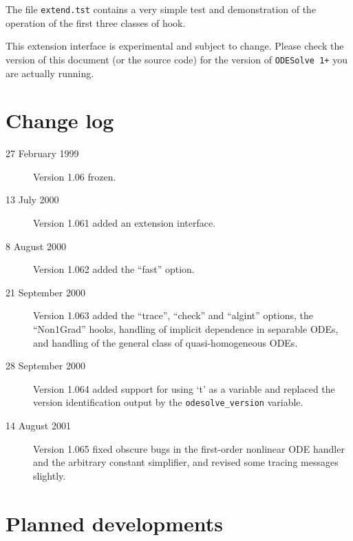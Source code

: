 \documentclass[a4paper]{article} %
\newcommand{\ODESolve}[1]{\texttt{ODESolve\,#1}}
\begin{document}
\noindent\hrulefill
\bigskip

The file \texttt{extend.tst} contains a very simple test and
demonstration of the operation of the first three classes of hook.

This extension interface is experimental and subject to change.
Please check the version of this document (or the source code) for the
version of \ODESolve{1+} you are actually running.


\section{Change log}

\begin{description}
\item[27 February 1999] Version 1.06 frozen.
\item[13 July 2000] Version 1.061 added an extension interface.
\item[8 August 2000] Version 1.062 added the ``fast'' option.
\item[21 September 2000] Version 1.063 added the ``trace'', ``check''
  and ``algint'' options, the ``Non1Grad'' hooks, handling of implicit
  dependence in separable ODEs, and handling of the general class of
  quasi-homogeneous ODEs.
\item[28 September 2000] Version 1.064 added support for using `t' as
  a variable and replaced the version identification output by the
  \verb|odesolve_version| variable.
\item[14 August 2001] Version 1.065 fixed obscure bugs in the
  first-order nonlinear ODE handler and the arbitrary constant
  simplifier, and revised some tracing messages slightly.

\end{description}


\section{Planned developments}
\end{document}
